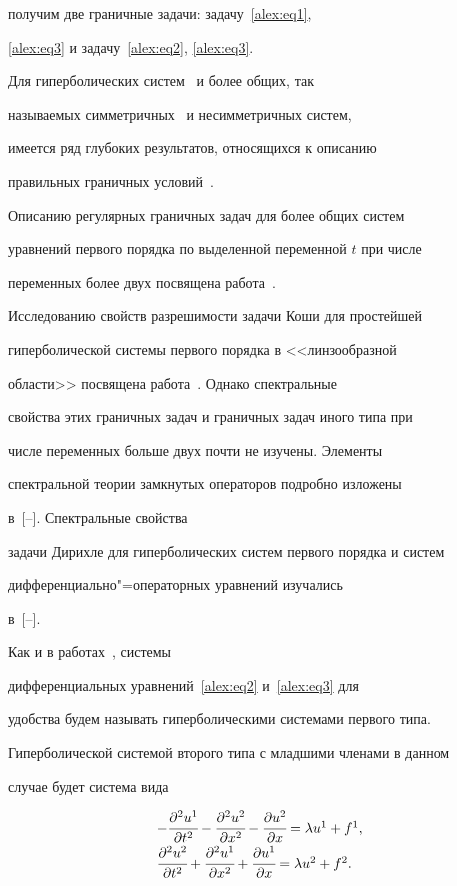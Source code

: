 получим две граничные задачи: задачу~\eqref{alex:eq1},

\eqref{alex:eq3} и задачу~\eqref{alex:eq2}, \eqref{alex:eq3}.



Для гиперболических систем~\cite{alex:bib1} и более общих, так

называемых симметричных~\cite{alex:bib2} и несимметричных систем,

имеется ряд глубоких результатов, относящихся  к описанию

правильных граничных условий~\cite{alex:bib3}.



Описанию регулярных граничных задач для более общих систем

уравнений первого порядка по выделенной переменной $t$ при числе

переменных более двух посвящена работа~\cite{alex:bib4}.

Исследованию свойств разрешимости задачи Коши для простейшей

гиперболической системы первого порядка в <<линзообразной

области>> посвящена работа~\cite{alex:bib3}. Однако спектральные

свойства этих граничных задач и граничных задач иного типа при

числе переменных больше двух почти не изучены. Элементы

спектральной теории замкнутых операторов подробно изложены

в~[--]. Спектральные свойства

задачи Дирихле для гиперболических систем первого порядка и систем

дифференциально"=операторных уравнений изучались

в~[--].



Как и в работах~\cite{alex:bib9,alex:bib10}, системы

дифференциальных уравнений~\eqref{alex:eq2} и~\eqref{alex:eq3} для

удобства будем называть гиперболическими системами первого типа.

Гиперболической системой второго типа с младшими членами в данном

случае будет система вида

\begin{equation}\label{alex:eq4}

\begin{array}{l}

-\cfrac{\partial^2{u^1}}{\partial{t}^2}-\cfrac{\partial^2{u^2}}{\partial{x}^2}-\cfrac{\partial{u^2}}{\partial{x}}

= \lambda{u^1}+f^1, \\[2mm]

\cfrac{\partial^2{u^2}}{\partial{t}^2}+\cfrac{\partial^2{u^1}}{\partial{x}^2}+\cfrac{\partial{u^1}}{\partial{x}}

= \lambda{u^2}+ f^2.

\end{array}

\end{equation}

